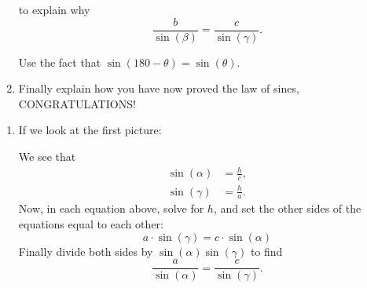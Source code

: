 \documentclass[noauthor,nooutcomes,handout,hints]{ximera}
\begin{document}
\begin{question}
\begin{enumerate}
\begin{center}
  \end{center}
  to explain why
  \[
  \frac{b}{\sin(\beta)} = \frac{c}{\sin(\gamma)}.
  \]
  \begin{hint}
    Use the fact that $\sin(180-\theta) = \sin(\theta)$.
  \end{hint}
\item Finally explain how you have now proved the law of sines, CONGRATULATIONS!
  \end{enumerate}
  \begin{freeResponse}
    \begin{enumerate}
    \item If we look at the first picture:
      \begin{center}
    \end{center}
    We see that
    \begin{align*}
      \sin(\alpha) &= \frac{h}{c},\\
      \sin(\gamma) &= \frac{h}{a}.
    \end{align*}
    Now, in each equation above, solve for $h$, and set the other
    sides of the equations equal to each other:
    \[
    a\cdot \sin(\gamma)=c\cdot \sin(\alpha)
    \]
    Finally divide both sides by $\sin(\alpha)\sin(\gamma)$ to find
    \[
    \frac{a}{\sin(\alpha)} = \frac{c}{\sin(\gamma)}.
    \]


\end{enumerate}
\end{freeResponse}
\end{question}
\end{document}
